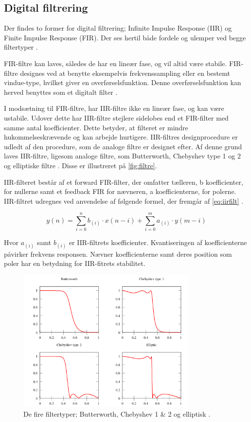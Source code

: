 \subsection{Digital filtrering} \label{sec:teori_filter}
Der findes to former for digital filtrering; Infinite Impulse Response (IIR) og Finite Impulse Response (FIR). Der ses hertil både fordele og ulemper ved begge filtertyper \citep{blandford2012}.

FIR-filtre kan laves, således de har en lineær fase, og vil altid være stabile. FIR-filtre designes ved at benytte eksempelvis frekvenssampling eller en bestemt vindue-type, hvilket giver en overførselsfunktion. Denne overførselsfunktion kan herved benyttes som et digitalt filter \citep{blandford2012}. 

I modsætning til FIR-filtre, har IIR-filtre ikke en lineær fase, og kan være ustabile. Udover dette har IIR-filtre stejlere sidelobes end et FIR-filter med samme antal koefficienter. Dette betyder, at filteret er mindre hukommelseskrævende og kan arbejde hurtigere. IIR-filtres designprocedure er udledt af den procedure, som de analoge filtre er designet efter. Af denne grund laves IIR-filtre, ligesom analoge filtre, som Butterworth, Chebyshev type 1 og 2 og elliptiske filtre \citep{blandford2012}. Disse er illustreret på \autoref{fig:filtre}.

IIR-filteret består af et forward FIR-filter, der omfatter tælleren, b koefficienter, for nullerne samt et feedback FIR for nævneren, a koefficienterne, for polerne. IIR-filtret udregnes ved anvendelse af følgende formel, der fremgår af \autoref{eq:iirfilt} \citep{francis2009}. 

\begin{equation} \label{eq:iirfilt}
	y(n)= \sum_{i=0}^{n} b_{(i)} \cdot x(n-i)+ \sum^{m}_{i=0} a_{(i)} \cdot y(m-i)
\end{equation}


Hvor $a_{(i)}$ samt  $b_{(i)}$ er IIR-filtrets koefficienter. Kvantiseringen af koefficienterne påvirker frekvens responsen. Nævner koefficienterne samt deres position som poler har en betydning for IIR-fitrets stabilitet\citep{francis2009}.

\begin{figure}[H]
\centering
\includegraphics[width=0.8\textwidth]{figures/filtre}
\caption{De fire filtertyper; Butterworth, Chebyshev 1 \& 2 og elliptisk \citep{wikipedia2016}.}
\label{fig:filtre}
\end{figure}

